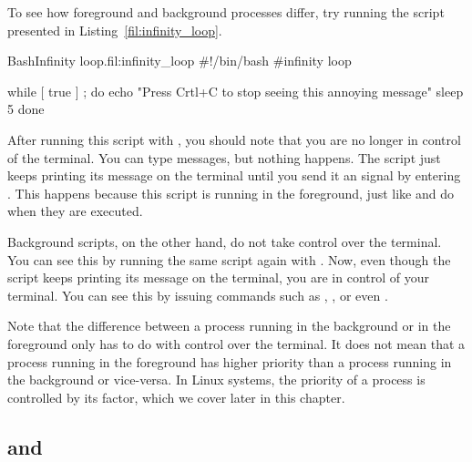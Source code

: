 To see how foreground and background processes differ, try running the script  presented in Listing~\ref{fil:infinity_loop}. 

\begin{source_code_float}{Bash}{Infinity loop.}{fil:infinity_loop}
#!/bin/bash
#infinity loop

while [ true ] ; do
   echo "Press Crtl+C to stop seeing this annoying message"
   sleep 5
done
\end{source_code_float}

After running this script with , you should note that you are no longer in control of the terminal. You can type messages, but nothing happens. The script just keeps printing its message on the terminal until you send it an  signal by entering . This happens because this script is running in the foreground, just like  and  do when they are executed.

Background scripts, on the other hand, do not take control over the terminal. You can see this by running the same script again with . Now, even though the script keeps printing its message on the terminal, you are in control of your terminal. You can see this by issuing commands such as , , or even . 

Note that the difference between a process running in the background or in the foreground only has to do with control over the terminal. It does not mean that a process running in the foreground has higher priority than a process running in the background or vice-versa. In Linux systems, the priority of a process is controlled by its  factor, which we cover later in this chapter.

\subsection{ and }

